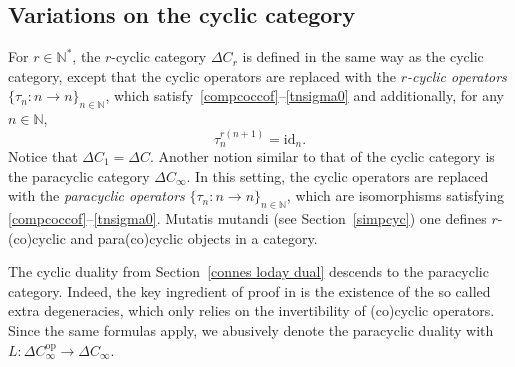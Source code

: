 \documentclass[10pt,a4paper]{amsart}
\numberwithin{equation}{section}
\newcommand{\co}{\colon}
\newcommand{\id}{\mathrm{id}}
\newcommand{\opp}{\mathrm{op}}
\newcommand{\N}{\mathbb{N}}
\begin{document}
\subsection{Variations on the cyclic category}


For $r\in \N^*$, the $r$-cyclic category $\Delta C_r$ is defined in the same way as the cyclic category, except that the cyclic operators are replaced with the $r$\emph{-cyclic operators} $\{\tau_n\co n \to n\}_{n\in \N}$, which satisfy~\eqref{compcoccof}--\eqref{tnsigma0} and additionally, for any~$n\in \N$,
\begin{equation*}%
 \tau_n^{r(n+1)}= \id_n.
\end{equation*}
Notice that $\Delta C_1=\Delta C$.
Another notion similar to that of the cyclic category is the paracyclic category $\Delta C_\infty$. In this setting, the cyclic operators are replaced with the \emph{paracyclic ope\-rators} $\{\tau_n\co n \to n\}_{n\in \N}$, which are isomorphisms satisfying \eqref{compcoccof}--\eqref{tnsigma0}.
Mutatis mutandi (see Section~\ref{simpcyc}) one defines $r$-(co)cyclic and para(co)cyclic objects in a category.

The cyclic duality from Section~\ref{connes loday dual} descends to the paracyclic category.
Indeed, the key ingredient of proof in \cite{loday98} is the existence of the so called extra dege\-neracies, which only relies on the invertibility of (co)cyclic operators. Since the same formulas apply, we abusively denote the paracyclic duality with $L \co \Delta C^\opp_\infty \to \Delta C_\infty$.
\end{document}
